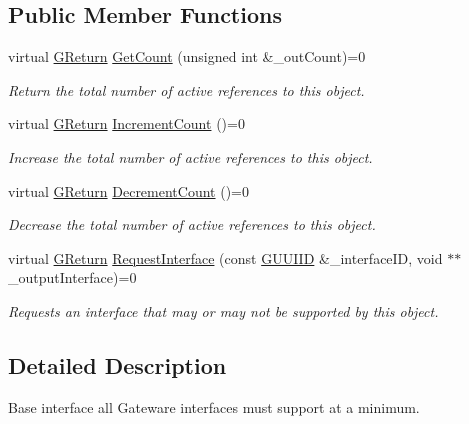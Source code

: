 \subsection*{Public Member Functions}
\begin{DoxyCompactItemize}
\item 
virtual \hyperlink{namespaceGW_a67a839e3df7ea8a5c5686613a7a3de21}{G\+Return} \hyperlink{classGW_1_1CORE_1_1GInterface_aacf5834174a7024f8a3c361122ee9e76}{Get\+Count} (unsigned int \&\+\_\+out\+Count)=0
\begin{DoxyCompactList}\small\item\em Return the total number of active references to this object. \end{DoxyCompactList}\item 
virtual \hyperlink{namespaceGW_a67a839e3df7ea8a5c5686613a7a3de21}{G\+Return} \hyperlink{classGW_1_1CORE_1_1GInterface_a2d710f20bb78e544e8309b5b75c21260}{Increment\+Count} ()=0
\begin{DoxyCompactList}\small\item\em Increase the total number of active references to this object. \end{DoxyCompactList}\item 
virtual \hyperlink{namespaceGW_a67a839e3df7ea8a5c5686613a7a3de21}{G\+Return} \hyperlink{classGW_1_1CORE_1_1GInterface_a19a368c77ad0aa7f49b5a4f772f173ba}{Decrement\+Count} ()=0
\begin{DoxyCompactList}\small\item\em Decrease the total number of active references to this object. \end{DoxyCompactList}\item 
virtual \hyperlink{namespaceGW_a67a839e3df7ea8a5c5686613a7a3de21}{G\+Return} \hyperlink{classGW_1_1CORE_1_1GInterface_ad6c8324970172784964f484686d4fdad}{Request\+Interface} (const \hyperlink{structGW_1_1GUUIID}{G\+U\+U\+I\+ID} \&\+\_\+interface\+ID, void $\ast$$\ast$\+\_\+output\+Interface)=0
\begin{DoxyCompactList}\small\item\em Requests an interface that may or may not be supported by this object. \end{DoxyCompactList}\end{DoxyCompactItemize}


\subsection{Detailed Description}
Base interface all Gateware interfaces must support at a minimum. 

